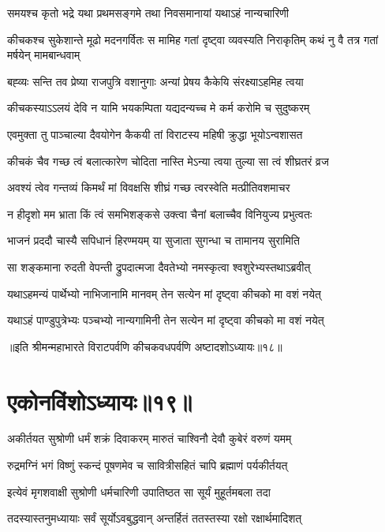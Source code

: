 \twolineshloka
{समयश्च कृतो भद्रे यथा प्रथमसङ्गमे}
{तथा निवसमानायां यथाऽहं नान्यचारिणी}


\threelineshloka
{कीचकश्च सुकेशान्ते मूढो मदनगर्वितः}
{स मामिह गतां दृष्ट्वा व्यवस्यति निराकृतिम्}
{कथं नु वै तत्र गतां मर्षयेन् मामबान्धवाम्}


\twolineshloka
{बह्व्यः सन्ति तव प्रेष्या राजपुत्रि वशानुगाः}
{अन्यां प्रेषय कैकेयि संरक्ष्याऽहमिह त्वया}


\twolineshloka
{कीचकस्याऽऽलयं देवि न यामि भयकम्पिता}
{यद्यदन्यच्च मे कर्म करोमि च सुदुष्करम्}


\twolineshloka
{एवमुक्ता तु पाञ्चाल्या दैवयोगेन कैकयी}
{तां विराटस्य महिषी क्रुद्धा भूयोऽन्वशासत}


\twolineshloka
{कीचकं चैव गच्छ त्वं बलात्कारेण चोदिता}
{नास्ति मेऽन्या त्वया तुल्या सा त्वं शीघ्रतरं व्रज}


\twolineshloka
{अवश्यं त्वेव गन्तव्यं किमर्थं मां विवक्षसि}
{शीघ्रं गच्छ त्वरस्वेति मत्प्रीतिवशमाचर}


\twolineshloka
{न हीदृशो मम भ्राता किं त्वं समभिशङ्कसे}
{उक्त्वा चैनां बलाच्चैव विनियुज्य प्रभुत्वतः}


\twolineshloka
{भाजनं प्रददौ चास्यै सपिधानं हिरण्मयम्}
{या सुजाता सुगन्धा च तामानय सुरामिति}


\twolineshloka
{सा शङ्कमाना रुदती वेपन्ती द्रुपदात्मजा}
{दैवतेभ्यो नमस्कृत्वा श्वशुरेभ्यस्तथाऽब्रवीत्}


\twolineshloka
{यथाऽहमन्यं पार्थेभ्यो नाभिजानामि मानवम्}
{तेन सत्येन मां दृष्ट्वा कीचको मा वशं नयेत्}


\twolineshloka
{यथाऽहं पाण्डुपुत्रेभ्यः पञ्चभ्यो नान्यगामिनी}
{तेन सत्येन मां दृष्ट्वा कीचको मा वशं नयेत्}

॥इति श्रीमन्महाभारते विराटपर्वणि कीचकवधपर्वणि अष्टादशोऽध्यायः॥१८॥

\chapter{एकोनविंशोऽध्यायः॥१९॥}

\twolineshloka
{अकीर्तयत सुश्रोणी धर्मं शक्रं दिवाकरम्}
{मारुतं चाश्विनौ देवौ कुबेरं वरुणं यमम्}


\twolineshloka
{रुद्रमग्निं भगं विष्णुं स्कन्दं पूषणमेव च}
{सावित्रीसहितं चापि ब्रह्माणं पर्यकीर्तयत्}


\twolineshloka
{इत्येवं मृगशवाक्षी सुश्रोणी धर्मचारिणी}
{उपातिष्ठत सा सूर्यं मुहूर्तमबला तदा}


\twolineshloka
{तदस्यास्तनुमध्यायाः सर्वं सूर्योऽवबुद्धवान्}
{अन्तर्हितं ततस्तस्या रक्षो रक्षार्थमादिशत्}


